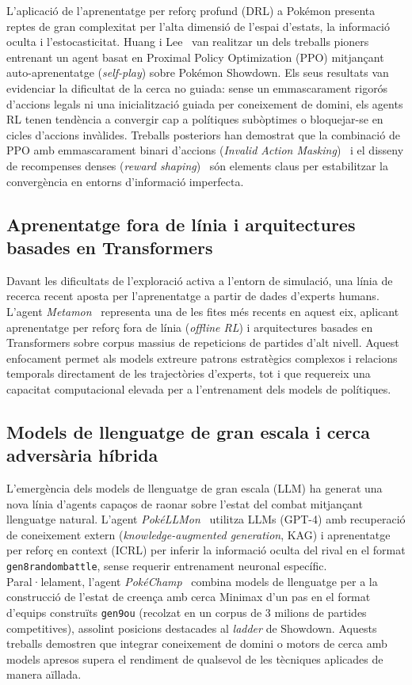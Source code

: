 L'aplicació de l'aprenentatge per reforç profund (DRL) a Pokémon presenta reptes de gran complexitat per l'alta dimensió de l'espai d'estats, la informació oculta i l'estocasticitat. Huang i Lee~\cite{pokemon_rl_huang} van realitzar un dels treballs pioners entrenant un agent basat en Proximal Policy Optimization (PPO) mitjançant auto-aprenentatge (\emph{self-play}) sobre Pokémon Showdown. Els seus resultats van evidenciar la dificultat de la cerca no guiada: sense un emmascarament rigorós d'accions legals ni una inicialització guiada per coneixement de domini, els agents RL tenen tendència a convergir cap a polítiques subòptimes o bloquejar-se en cicles d'accions invàlides. Treballs posteriors han demostrat que la combinació de PPO amb emmascarament binari d'accions (\emph{Invalid Action Masking})~\cite{huang_action_masking} i el disseny de recompenses denses (\emph{reward shaping})~\cite{ng_reward_shaping} són elements claus per estabilitzar la convergència en entorns d'informació imperfecta.

\subsection{Aprenentatge fora de línia i arquitectures basades en Transformers}

Davant les dificultats de l'exploració activa a l'entorn de simulació, una línia de recerca recent aposta per l'aprenentatge a partir de dades d'experts humans. L'agent \textit{Metamon}~\cite{grigsby_metamon} representa una de les fites més recents en aquest eix, aplicant aprenentatge per reforç fora de línia (\emph{offline RL}) i arquitectures basades en Transformers sobre corpus massius de repeticions de partides d'alt nivell. Aquest enfocament permet als models extreure patrons estratègics complexos i relacions temporals directament de les trajectòries d'experts, tot i que requereix una capacitat computacional elevada per a l'entrenament dels models de polítiques.

\subsection{Models de llenguatge de gran escala i cerca adversària híbrida}

L'emergència dels models de llenguatge de gran escala (LLM) ha generat una nova línia d'agents capaços de raonar sobre l'estat del combat mitjançant llenguatge natural. L'agent \textit{PokéLLMon}~\cite{pokellmon} utilitza LLMs (GPT-4) amb recuperació de coneixement extern (\emph{knowledge-augmented generation}, KAG) i aprenentatge per reforç en context (ICRL) per inferir la informació oculta del rival en el format \texttt{gen8randombattle}, sense requerir entrenament neuronal específic. Paral·lelament, l'agent \textit{PokéChamp}~\cite{pokechamp, pokechamp_icml} combina models de llenguatge per a la construcció de l'estat de creença amb cerca Minimax d'un pas en el format d'equips construïts \texttt{gen9ou} (recolzat en un corpus de 3 milions de partides competitives), assolint posicions destacades al \emph{ladder} de Showdown. Aquests treballs demostren que integrar coneixement de domini o motors de cerca amb models apresos supera el rendiment de qualsevol de les tècniques aplicades de manera aïllada.

